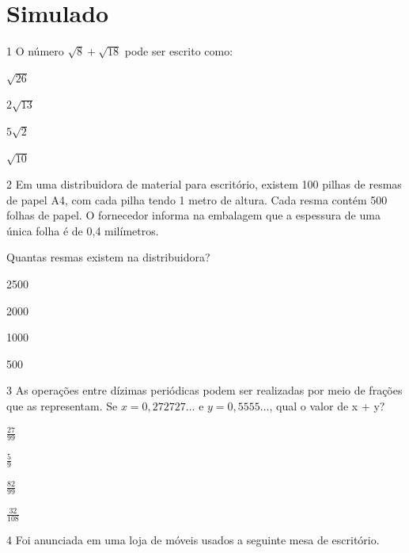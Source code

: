 \chapter[Simulado 3]{Simulado}

\num{1} O número $\sqrt{8} + \sqrt{18}$ pode ser escrito como:

\begin{escolha}

  \item $\sqrt{26}$
  \item $2\sqrt{13}$
  \item $5\sqrt{2}$
  \item $\sqrt{10}$

\end{escolha}

\num{2} Em uma distribuidora de material para escritório, existem 100 
pilhas de resmas de papel A4, com cada pilha tendo 1 metro de altura. Cada 
resma contém 500 folhas de papel. O fornecedor informa na embalagem que a 
espessura de uma única folha é de 0,4 milímetros.

Quantas resmas existem na distribuidora?

\begin{escolha}

\item 2500

\item 2000

\item 1000

\item 500

\end{escolha}

\num{3} As operações entre dízimas periódicas podem ser realizadas 
por meio de frações que as representam. Se $x = 0,272727\ldots{}$ e 
$y = 0,5555\ldots{}$, qual o valor de x + y?

\begin{escolha}

\item $\frac{27}{99}$

\item $\frac{5}{9}$

\item $\frac{82}{99}$

\item $\frac{32}{108}$

\end{escolha}

\pagebreak
\num{4} Foi anunciada em uma loja de móveis usados a seguinte mesa de
escritório.

